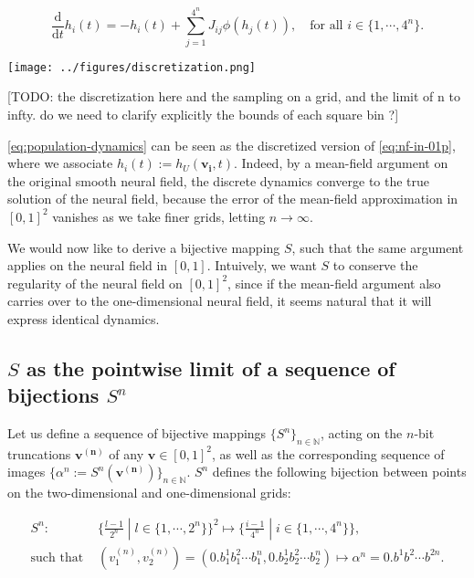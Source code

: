 \documentclass[10pt,letterpaper]{article}
\def\d{\mathrm d}
\renewcommand{\vec}[1]{\boldsymbol{#1}}
\begin{document}
\begin{equation} \label{eq:population-dynamics}
\frac{\d}{\d t} h_i(t) = -h_i(t) + \sum_{j=1}^{4^n} J_{ij} \phi(h_j(t)), \quad \text{for all } i \in \{1,\cdots,4^n\}.
\end{equation}

\texttt{[image: ../figures/discretization.png]}

[TODO: the discretization here and the sampling on a grid, and the limit of n to infty. do we need to clarify explicitly the bounds of each square bin ?]
\endif

\autoref{eq:population-dynamics} can be seen as the discretized version of \autoref{eq:nf-in-01p}, where we associate $h_i(t) := h_U(\vec{v_i}, t)$. Indeed, by a mean-field argument on the original smooth neural field, the discrete dynamics converge to the true solution of the neural field, because the error of the mean-field approximation in $[0,1]^2$ vanishes as we take finer grids, letting $n \to \infty$.

We would now like to derive a bijective mapping $S$, such that the same argument applies on the neural field in $[0,1]$. Intuively, we want $S$ to conserve the regularity of the neural field on $[0,1]^2$, since if the mean-field argument also carries over to the one-dimensional neural field, it seems natural that it will express identical dynamics.

\subsection{$S$ as the pointwise limit of a sequence of bijections $S^n$}

Let us define a sequence of bijective mappings $\{S^n\}_{n \in \mathbb N}$, acting on the $n$-bit truncations $\vec{v^{(n)}}$ of any $\vec{v} \in [0,1]^2$, as well as the corresponding sequence of images $\{\alpha^n := S^n(\vec{v^{(n)}})\}_{n \in \mathbb N}$. $S^n$ defines the following bijection between points on the two-dimensional and one-dimensional grids:

\begin{equation} \label{eq:def-S} \begin{aligned}
S^n :& \{\tfrac{l-1}{2^n}\;|\;l\in\{1,\cdots,2^n\}\}^2 \mapsto \{\tfrac{i-1}{4^n}\;|\;i\in\{1,\cdots,4^n\}\},\\
\text{such that }&(v_1^{(n)}, v_2^{(n)}) = (0.b_1^1 b_1^2 \cdots b_1^n, 0.b_2^1 b_2^2 \cdots b_2^n) \mapsto \alpha^n = 0.b^1 b^2 \cdots b^{2n}.
\end{aligned} \end{equation}
\end{document}
